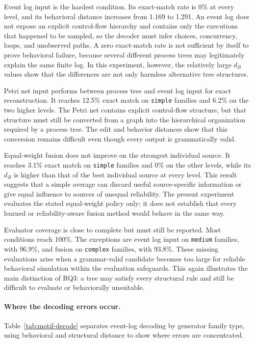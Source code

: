 \documentclass[mathematics,article,submit,moreauthors]{Definitions/mdpi}
\begin{document}
Event log input is the hardest condition. Its exact-match rate is 0\% at every level, and its behavioral distance increases from 1.169 to 1.291. An event log does not expose an explicit control-flow hierarchy and contains only the executions that happened to be sampled, so the decoder must infer choices, concurrency, loops, and unobserved paths. A zero exact-match rate is not sufficient by itself to prove behavioral failure, because several different process trees may legitimately explain the same finite log. In this experiment, however, the relatively large $d_B$ values show that the differences are not only harmless alternative tree structures.

Petri net input performs between process tree and event log input for exact reconstruction. It reaches 12.5\% exact match on \texttt{simple} families and 6.2\% on the two higher levels. The Petri net contains explicit control-flow structure, but that structure must still be converted from a graph into the hierarchical organization required by a process tree. The edit and behavior distances show that this conversion remains difficult even though every output is grammatically valid.

Equal-weight fusion does not improve on the strongest individual source. It reaches 3.1\% exact match on \texttt{simple} families and 0\% on the other levels, while its $d_B$ is higher than that of the best individual source at every level. This result suggests that a simple average can discard useful source-specific information or give equal influence to sources of unequal reliability. The present experiment evaluates the stated equal-weight policy only; it does not establish that every learned or reliability-aware fusion method would behave in the same way.

Evaluator coverage is close to complete but must still be reported. Most conditions reach 100\%. The exceptions are event log input on \texttt{medium} families, with 96.9\%, and fusion on \texttt{complex} families, with 93.8\%. These missing evaluations arise when a grammar-valid candidate becomes too large for reliable behavioral simulation within the evaluation safeguards. This again illustrates the main distinction of RQ3: a tree may satisfy every structural rule and still be difficult to evaluate or behaviorally unsuitable.

\paragraph{Where the decoding errors occur.}
Table~\ref{tab:motif-decode} separates event-log decoding by generator family type, using behavioral and structural distance to show where errors are concentrated.
\end{document}
